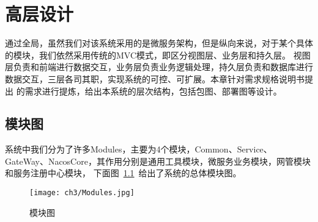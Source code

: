 \chapter{高层设计}
通过全局，虽然我们对该系统采用的是微服务架构，但是纵向来说，对于某个具体的模块，我们依然采用传统的MVC模式，即区分视图层、业务层和持久层。
视图层负责和前端进行数据交互，业务层负责业务逻辑处理，持久层负责和数据库进行数据交互，三层各司其职，实现系统的可控、可扩展。本章针对需求规格说明书提出
的需求进行提炼，给出本系统的层次结构，包括包图、部署图等设计。

\section{模块图}
系统中我们分为了许多Modules，主要为4个模块，Common、Service、GateWay、NacosCore，其作用分别是通用工具模块，微服务业务模块，网管模块和服务注册中心模块，
下面图~\ref{fig:Modules}~给出了系统的总体模块图。
\begin{figure}[htbp]
    \centering
    \texttt{[image: ch3/Modules.jpg]}
    \caption{模块图}\label{fig:Modules}
    \vspace{\baselineskip} %
\end{figure}

